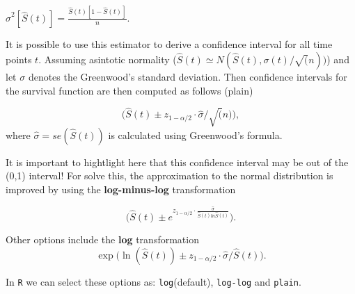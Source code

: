 \documentclass[]{book}
\theoremstyle{definition}
\theoremstyle{definition}
\theoremstyle{definition}
\theoremstyle{remark}
\begin{document}
\(\hat \sigma^2[\hat S(t)] = \frac{\hat S(t) [1- \hat S(t)]}{n}\).

It is possible to use this estimator to derive a confidence interval for
all time points \(t\). Assuming asintotic normality
(\(\hat S(t) \simeq N(\hat S(t), \sigma(t)/\sqrt(n))\)) and let
\(\sigma\) denotes the Greenwood's standard deviation. Then confidence
intervals for the survival function are then computed as follows (plain)

\[
\bigg(\hat S(t) \pm z_{1-\alpha/2}  \cdot \hat \sigma/\sqrt(n) \bigg), 
\] where \(\hat \sigma = se(\hat S(t))\) is calculated using Greenwood's
formula.

It is important to hightlight here that this confidence interval may be
out of the (0,1) interval! For solve this, the approximation to the
normal distribution is improved by using the \textbf{log-minus-log}
transformation

\[
\bigg(\hat S(t) \pm e^{z_{1-\alpha/2}  \cdot  \frac{\hat\sigma}{\hat S(t) ln \hat S(t)}} \bigg). 
\]

Other options include the \textbf{log} transformation \[
 \exp \bigg( \ln(\hat S(t)) \pm z_{1-\alpha/2}  \cdot \hat\sigma/ \hat S(t)  \bigg). 
\]

In \texttt{R} we can select these options as: \texttt{log}(default),
\texttt{log-log} and \texttt{plain}.
\end{document}
